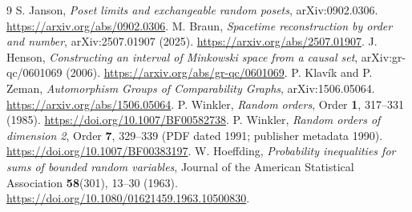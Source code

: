 \documentclass[11pt]{article}
\theoremstyle{remark}
\begin{document}
\begin{thebibliography}{9}
 S. Janson, \emph{Poset limits and exchangeable random
posets}, arXiv:0902.0306. \url{https://arxiv.org/abs/0902.0306}.
 M. Braun, \emph{Spacetime reconstruction by order and
number}, arXiv:2507.01907 (2025).
\url{https://arxiv.org/abs/2507.01907}.
 J. Henson, \emph{Constructing an interval of Minkowski
space from a causal set}, arXiv:gr-qc/0601069 (2006).
\url{https://arxiv.org/abs/gr-qc/0601069}.
 P. Klav\'ik and P. Zeman,
\emph{Automorphism Groups of Comparability Graphs},
arXiv:1506.05064. \url{https://arxiv.org/abs/1506.05064}.
 P. Winkler, \emph{Random orders},
Order \textbf{1}, 317--331 (1985).
\url{https://doi.org/10.1007/BF00582738}.
 P. Winkler, \emph{Random orders of dimension 2},
Order \textbf{7}, 329--339 (PDF dated 1991; publisher metadata 1990).
\url{https://doi.org/10.1007/BF00383197}.
 W. Hoeffding, \emph{Probability inequalities for
sums of bounded random variables}, Journal of the American Statistical
Association \textbf{58}(301), 13--30 (1963).
\url{https://doi.org/10.1080/01621459.1963.10500830}.
\end{thebibliography}
\end{document}
